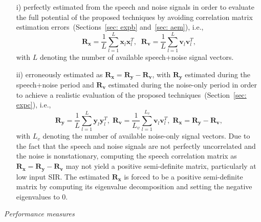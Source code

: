 \documentclass[draftcls,onecolumn,11pt]{IEEEtran}
\begin{document}
\begin{itemize}
  \item[i)] perfectly estimated from the speech and noise signals in order to evaluate the full potential of the proposed techniques by avoiding correlation matrix estimation errors~(Sections~\ref{sec: expb} and~\ref{sec: aem}), i.e.,
\begin{equation}
\label{eq: corr}
\mathbf{R}_{\mathbf{x}} = \frac{1}{L} \sum_{l = 1}^{L} \mathbf{x}^{}_l \mathbf{x}^T_l, \; \; \mathbf{R}_{\mathbf{v}} = \frac{1}{L} \sum_{l = 1}^{L} \mathbf{v}^{}_l \mathbf{v}^T_l,
\end{equation}
with $L$ denoting the number of available speech+noise signal vectors.
  \item[ii)] erroneously estimated as $\mathbf{R}_{\mathbf{x}} = \mathbf{R}_{\mathbf{y}} - \mathbf{R}_{\mathbf{v}}$, with $\mathbf{R}_{\mathbf{y}}$ estimated during the speech+noise period and $\mathbf{R}_{\mathbf{v}}$ estimated during the noise-only period in order to achieve a realistic evaluation of the proposed techniques~(Section~\ref{sec: expc}), i.e., 
\begin{equation}
\label{eq: corrdiff}
\mathbf{R}_{\mathbf{y}} \!=\! \frac{1}{L} \sum_{l = 1}^{L} \mathbf{y}^{}_l \mathbf{y}^T_l, \; \mathbf{R}_{\mathbf{v}} \!=\! \frac{1}{L_v} \sum_{l = 1}^{L_v} \mathbf{v}^{}_l \mathbf{v}^T_l, \; \mathbf{R}_{\mathbf{x}} \!=\! \mathbf{R}_{\mathbf{y}} - \mathbf{R}_{\mathbf{v}},
\end{equation}
with $L_v$ denoting the number of available noise-only signal vectors.
Due to the fact that the speech and noise signals are not perfectly uncorrelated and the noise is nonstationary, computing the speech correlation matrix as $\mathbf{R}_{\mathbf{x}} = \mathbf{R}_{\mathbf{y}} - \mathbf{R}_{\mathbf{v}}$ may not yield a positive semi-definite matrix, particularly at low input SIR.
The estimated $\mathbf{R}_{\mathbf{x}}$ is forced to be a positive semi-definite matrix by computing its eigenvalue decomposition and setting the negative eigenvalues to $0$.
\end{itemize}

\hspace{-0.38cm}\textit{Performance measures}
\end{document}
